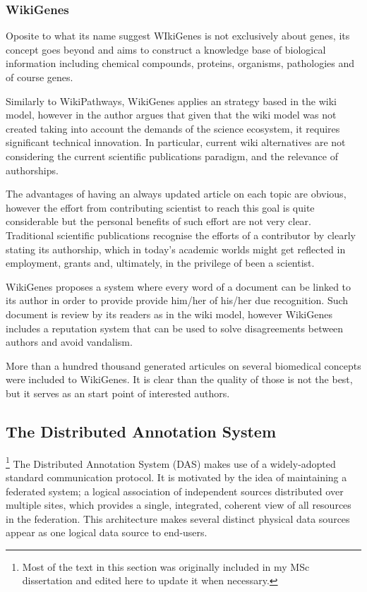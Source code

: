 \subsubsection{WikiGenes}
Oposite to what its name suggest WIkiGenes is not exclusively about genes, its concept goes beyond and aims to construct a knowledge base of biological information including chemical compounds, proteins, organisms, pathologies and of course genes. 

Similarly to WikiPathways, WikiGenes applies an strategy based in the wiki model, however in \cite{HOF2008} the author argues that given that the wiki model was not created taking into account the demands of the science ecosystem, it requires significant technical innovation. In particular, current wiki alternatives are not considering the current scientific publications paradigm, and the relevance of authorships. 

The advantages of having an always updated article on each topic are obvious, however the effort from contributing scientist to reach this goal is quite considerable but the personal benefits of such effort are not very clear. Traditional scientific publications recognise the efforts of a contributor by clearly stating its authorship, which in today's academic worlds might get reflected in employment, grants and, ultimately, in the privilege of been a scientist.

WikiGenes proposes a system where every word of a document can be linked to its author in order to provide provide him/her of his/her due recognition. Such document is review by its readers as in the wiki model, however WikiGenes includes a reputation system that can be used to solve disagreements between authors and avoid vandalism.

More than a hundred thousand generated articules on several biomedical concepts were included to WikiGenes. It is clear than the quality of those is not the best, but it serves as an start point of interested authors.

\subsection{The Distributed Annotation System}
\footnote{Most of the text in this section was originally included in my MSc dissertation\cite{SAL2010} and edited here to update it when necessary.}
The Distributed Annotation System (DAS) \cite{DOW2001} makes use of a widely-adopted standard communication protocol. It is motivated by the idea of maintaining a federated system; a logical association of independent sources distributed over multiple sites, which provides a single, integrated, coherent view of all resources in the federation. This architecture makes several distinct physical data sources appear as one logical data source to end-users. 


